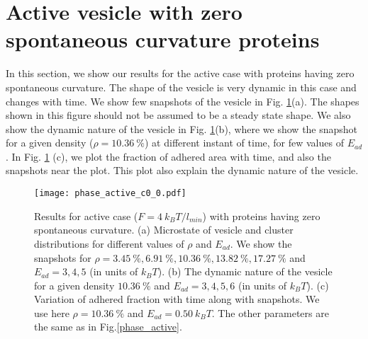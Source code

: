 \documentclass[pre,amsmath]{revtex4}
\begin{document}
\section{Active vesicle with zero spontaneous curvature proteins}
\label{sec:active_c0_0}
In this section, we show our results for the active case with proteins having zero spontaneous curvature. The shape of the vesicle is very dynamic in this case and changes with time. We show few snapshots of the vesicle in Fig. \ref{active_c0_0}(a). The shapes shown in this figure should not be assumed to be a steady state shape. We also show the dynamic nature of the vesicle in Fig. \ref{active_c0_0}(b), where we show the snapshot for a given density ($\rho = 10.36 ~\%$) at different instant of time, for few values of $E_{ad}$. In Fig. \ref{active_c0_0} (c), we plot the fraction of adhered area with time, and also the snapshots near the plot. This plot also explain the dynamic nature of the vesicle.
\begin{figure}[ht]
\centering
\texttt{[image: phase\_active\_c0\_0.pdf]}
\caption{Results for active case ($F=4~k_B T/l_{min}$) with proteins having zero spontaneous curvature. (a) Microstate of vesicle and cluster distributions for different values of $\rho$ and $E_{ad}$. We show the snapshots for $\rho=3.45 ~\%, 6.91 ~\% ,  10.36 ~\%, 13.82 ~\%, 17.27~\%$ and $E_{ad}= 3, 4, 5$ (in units of $k_B T$). (b) The dynamic nature of the vesicle for a given density $10.36 ~\%$ and  $E_{ad}=3, 4, 5, 6$ (in units of $k_B T$). (c) Variation of adhered fraction with time along with snapshots. We use here $\rho=10.36 ~\%$ and $E_{ad}=0.50 ~k_B T$. The other parameters are the same as in Fig.\ref{phase_active}.}
\label{active_c0_0} 
\end{figure}

\end{document}
